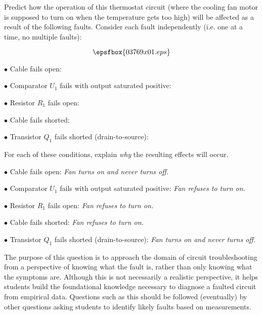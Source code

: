 

Predict how the operation of this thermostat circuit (where the cooling fan motor is supposed to turn on when the temperature gets too high) will be affected as a result of the following faults.  Consider each fault independently (i.e. one at a time, no multiple faults):

$$\epsfbox{03769x01.eps}$$

\medskip
\item{$\bullet$} Cable fails open:
\vskip 5pt
\item{$\bullet$} Comparator $U_1$ fails with output saturated positive:
\vskip 5pt
\item{$\bullet$} Resistor $R_1$ fails open:
\vskip 5pt
\item{$\bullet$} Cable fails shorted:
\vskip 5pt
\item{$\bullet$} Transistor $Q_1$ fails shorted (drain-to-source):
\medskip

For each of these conditions, explain {\it why} the resulting effects will occur.







\medskip
\item{$\bullet$} Cable fails open: {\it Fan turns on and never turns off.}
\vskip 5pt
\item{$\bullet$} Comparator $U_1$ fails with output saturated positive: {\it Fan refuses to turn on.}
\vskip 5pt
\item{$\bullet$} Resistor $R_1$ fails open: {\it Fan refuses to turn on.}
\vskip 5pt
\item{$\bullet$} Cable fails shorted: {\it Fan refuses to turn on.}
\vskip 5pt
\item{$\bullet$} Transistor $Q_1$ fails shorted (drain-to-source): {\it Fan turns on and never turns off.}
\medskip







The purpose of this question is to approach the domain of circuit troubleshooting from a perspective of knowing what the fault is, rather than only knowing what the symptoms are.  Although this is not necessarily a realistic perspective, it helps students build the foundational knowledge necessary to diagnose a faulted circuit from empirical data.  Questions such as this should be followed (eventually) by other questions asking students to identify likely faults based on measurements.




